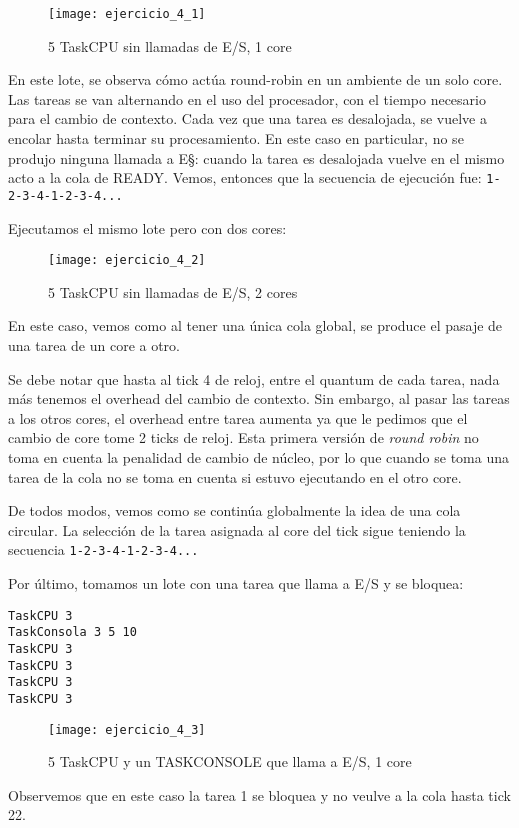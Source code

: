 \begin{figure}[H]
\caption{5 TaskCPU sin llamadas de E/S, 1 core}
\texttt{[image: ejercicio\_4\_1]}
\end{figure}

En este lote, se observa c\'omo act\'ua round-robin en un ambiente de un solo core. Las tareas se van alternando en el uso del procesador, con el tiempo necesario para el cambio de contexto. Cada vez que una tarea es desalojada, se vuelve a encolar hasta terminar su procesamiento. En este caso en particular, no se produjo ninguna llamada a E\S: cuando la tarea es desalojada vuelve en el mismo acto a la cola de READY. Vemos, entonces que la secuencia de ejecuci\'on fue: \verb+1-2-3-4-1-2-3-4...+

Ejecutamos el mismo lote pero con dos cores:

\begin{figure}[H]
\caption{5 TaskCPU sin llamadas de E/S, 2 cores}
\texttt{[image: ejercicio\_4\_2]}
\end{figure}

En este caso, vemos como al tener una \'unica cola global, se produce el pasaje de una tarea de un core a otro. 

Se debe notar que hasta al tick 4 de reloj, entre el quantum de cada tarea, nada m\'as tenemos el overhead del cambio de contexto. Sin embargo, al pasar las tareas a los otros cores, el overhead entre tarea aumenta ya que le pedimos que el cambio de core tome 2 ticks de reloj. Esta primera versi\'on de \textit{round robin} no toma en cuenta la penalidad de cambio de n\'ucleo, por lo que cuando se toma una tarea de la cola no se toma en cuenta si estuvo ejecutando en el otro core.

De todos modos, vemos como se contin\'ua globalmente la idea de una cola circular. La selecci\'on de la tarea asignada al core del tick sigue teniendo la secuencia \verb+1-2-3-4-1-2-3-4...+

Por \'ultimo, tomamos un lote con una tarea que llama a E/S y se bloquea:

\begin{verbatim}
TaskCPU 3
TaskConsola 3 5 10
TaskCPU 3
TaskCPU 3
TaskCPU 3
TaskCPU 3
\end{verbatim}

\begin{figure}[H]
\caption{5 TaskCPU y un TASKCONSOLE que llama a E/S, 1 core}
\texttt{[image: ejercicio\_4\_3]}
\end{figure}

Observemos que en este caso la tarea 1 se bloquea y no veulve a la cola hasta tick 22.